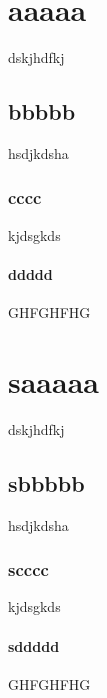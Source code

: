 \hypertarget{aaaaa}{%
\section{aaaaa}\label{aaaaa}}

dskjhdfkj

\hypertarget{bbbbb}{%
\subsection{bbbbb}\label{bbbbb}}

hsdjkdsha

\hypertarget{cccc}{%
\subsubsection{cccc}\label{cccc}}

kjdsgkds

\hypertarget{ddddd}{%
\paragraph{ddddd}\label{ddddd}}

GHFGHFHG

\hypertarget{saaaaa}{%
\section{saaaaa}\label{saaaaa}}

dskjhdfkj

\hypertarget{sbbbbb}{%
\subsection{sbbbbb}\label{sbbbbb}}

hsdjkdsha

\hypertarget{scccc}{%
\subsubsection{scccc}\label{scccc}}

kjdsgkds

\hypertarget{sddddd}{%
\paragraph{sddddd}\label{sddddd}}

GHFGHFHG
